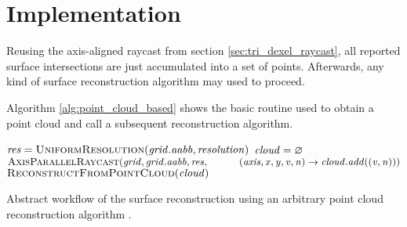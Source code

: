 \section{Implementation}
\label{sec:point_cloud_implementation}

Reusing the axis-aligned raycast from section \ref{sec:tri_dexel_raycast}, all reported surface intersections are just accumulated into a set of points.
Afterwards, any kind of surface reconstruction algorithm may used to proceed.

Algorithm \ref{alg:point_cloud_based} shows the basic routine used to obtain a point cloud and call a subsequent reconstruction algorithm.
%
\begin{algorithm}
	\centering
	\begin{algorithmic}[1]
			\State $\var{res} = \Call{UniformResolution}{\var{grid}.\var{aabb}, \var{resolution}}$
			\State $\mathit{cloud} = \varnothing$
			\State $\Call{AxisParallelRaycast}{\var{grid}, \var{grid}.\var{aabb}, \var{res},\hfill\break
				\hspace*{\dimexpr\algorithmicindent*2}(\var{axis}, \var{x}, \var{y}, \var{v}, \var{n}) \rightarrow \var{cloud}.\var{add}((\var{v}, \var{n}))}$
			\State \Return $\Call{ReconstructFromPointCloud}{\var{cloud}}$
		\EndFunction
	\end{algorithmic}
	\caption{
		Abstract workflow of the surface reconstruction using an arbitrary point cloud reconstruction algorithm .
	}
	\label{alg:point_cloud_based}
\end{algorithm}
%







